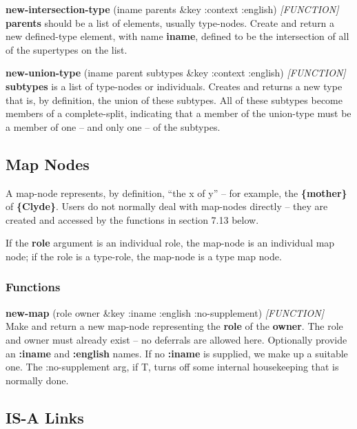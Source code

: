 \documentclass[titlepage,twoside,openright,11pt]{article}
\begin{document}
\textbf{new-intersection-type} (iname parents \&key :context :english)
\emph{{[}FUNCTION{]}}\\
\textbf{parents} should be a list of elements, usually type-nodes.
Create and return a new defined-type element, with name \textbf{iname},
defined to be the intersection of all of the supertypes on the list.

\textbf{new-union-type} (iname parent subtypes \&key :context :english)
\emph{{[}FUNCTION{]}}\\
\textbf{subtypes} is a list of type-nodes or individuals. Creates and
returns a new type that is, by definition, the union of these subtypes.
All of these subtypes become members of a complete-split, indicating
that a member of the union-type must be a member of one -- and only one
-- of the subtypes.

\subsection{Map Nodes}\label{map-nodes}

A map-node represents, by definition, ``the x of y'' -- for example, the
\textbf{\{mother\}} of \textbf{\{Clyde\}}. Users do not normally deal
with map-nodes directly -- they are created and accessed by the
functions in section 7.13 below.

If the \textbf{role} argument is an individual role, the map-node is an
individual map node; if the role is a type-role, the map-node is a type
map node.

\subsubsection{Functions}\label{functions-3}

\textbf{new-map} (role owner \&key :iname :english :no-supplement)
\emph{{[}FUNCTION{]}}\\
Make and return a new map-node representing the \textbf{role} of the
\textbf{owner}. The role and owner must already exist -- no deferrals
are allowed here. Optionally provide an \textbf{:iname} and
\textbf{:english} names. If no \textbf{:iname} is supplied, we make up a
suitable one. The :no-supplement arg, if T, turns off some internal
housekeeping that is normally done.

\subsection{IS-A Links}\label{is-a-links}
\end{document}
